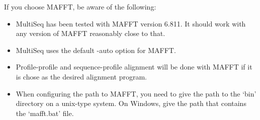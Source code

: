If you choose MAFFT, be aware of the following:
\begin{itemize}
\item MultiSeq has been tested with MAFFT version 6.811.  It should work
with any version of MAFFT reasonably close to that.
\item MultiSeq uses the default \textsf{-auto} option for MAFFT.
\item Profile-profile and sequence-profile alignment will be done with
MAFFT if it is chose as the desired alignment program.
\item When configuring the path to MAFFT, you need to give the path to
the `bin' directory on a unix-type system.  On Windows, give the path
that contains the `mafft.bat' file.
\end{itemize}


